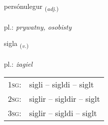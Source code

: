 \documentclass[frontgrid, backgrid]{flacards}\usepackage[]{graphicx}\usepackage[]{xcolor}
\begin{document}
\renewcommand{\flhead}{\vskip5pt \fboxsep=0pt {\small\bfseries\footnotesize Lýsingarorð | Adjective}}
\renewcommand{\fcfoot}{\vskip5pt \fboxsep=0pt \hspace{2pt}{\small\bfseries\footnotesize 2K}}

\renewcommand{\blhead}{\vskip5pt {\small\bfseries\footnotesize Lýsingarorð | Adjective }}
\renewcommand{\bcfoot}{\vskip5pt \hspace{2pt}{\small\bfseries\footnotesize 2K}}


{persónulegur \small{\textsubscript{(\textit{adj.})}} \\[1ex] %
 \\
pl.: \emph{prywatny, osobisty} \\  [2ex]
\renewcommand*{\arraystretch}{0.8}
}

\renewcommand{\flhead}{\vskip5pt \fboxsep=0pt {\small\bfseries\footnotesize Sagnorð | Verb}}
\renewcommand{\fcfoot}{\vskip5pt \fboxsep=0pt \hspace{2pt}{\small\bfseries\footnotesize 2K}}

\renewcommand{\blhead}{\vskip5pt {\small\bfseries\footnotesize Sagnorð | Verb }}
\renewcommand{\bcfoot}{\vskip5pt \hspace{2pt}{\small\bfseries\footnotesize 2K}}


{sigla \small{\textsubscript{(\textit{v.})}} \\[1ex] %
\textphonetic{[sɪkla]} \\
pl.: \emph{żagiel} \\  [2ex]
\renewcommand*{\arraystretch}{0.8}
\begin{tabular}{p{1cm}l}
\textsc{1sg}: & sigli -- sigldi -- siglt \\ 
\textsc{2sg}: & siglir -- sigldir -- siglt \\ 
\textsc{3sg}: & siglir -- sigldi -- siglt \\ 
\end{tabular}
}
\end{document}
